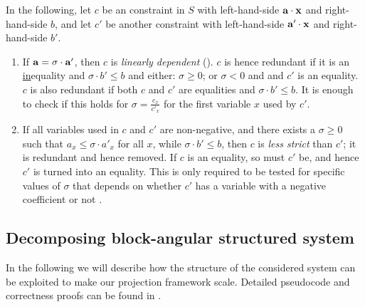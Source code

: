 In the following, let $c$ be an constraint in $S$ with left-hand-side $\mathbf{a}\cdot \mathbf{x}$ and right-hand-side $b$, and let $c'$ be another constraint with left-hand-side $\mathbf{a}'\cdot \mathbf{x}$ and right-hand-side $b'$. 
\begin{enumerate} \itemsep0em
\item 
If $\mathbf{a}=\sigma\cdot \mathbf{a}'$, then $c$ is \emph{linearly dependent} (\cite{lassez93}). $c$ is hence redundant if
it is an \underline{in}equality and $\sigma\cdot b'\leq b$ and either: $\sigma\geq 0$; or $\sigma<0$ and and $c'$ is an equality. $c$ is also redundant if both $c$ and $c'$ are equalities and $\sigma\cdot b'\leq b$. 
It is enough to check if this holds for $\sigma = \frac{c_x}{c'_x}$ for the first variable $x$ used by $c'$.
\item
If all variables used in $c$ and $c'$ are non-negative, and there exists a $\sigma\geq 0$ such that $a_x \leq \sigma \cdot a'_x$ for all $x$, while $\sigma\cdot b' \leq b$, then $c$ is \emph{less strict} than $c'$; it is redundant and hence removed. If $c$ is an equality, so must $c'$ be, and hence $c'$ is turned into an equality. 
This is only required to be tested for specific values of $\sigma$ that depends on whether $c'$ has a variable with a negative coefficient or not \cite{MyTechRep}.
\end{enumerate} 

\subsection{Decomposing block-angular structured system}
\label{sec:decomp}
In the following we will describe how the structure of the considered system can be exploited to make our projection framework scale. Detailed pseudocode and correctness proofs can be found in \cite{MyTechRep}. 

